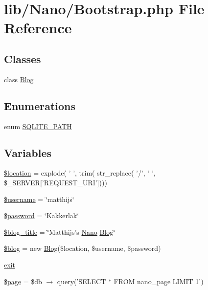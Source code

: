 \hypertarget{Bootstrap_8php}{
\section{lib/Nano/Bootstrap.php File Reference}
\label{Bootstrap_8php}
}
\subsection*{Classes}
\begin{CompactItemize}
\item 
class \hyperlink{classBlog}{Blog}
\end{CompactItemize}
\subsection*{Enumerations}
\begin{CompactItemize}
\item 
enum \hyperlink{Bootstrap_8php_6c0b526c01fb7fbb58a9ff1508514cb2}{SQLITE\_\-PATH} 
\end{CompactItemize}
\subsection*{Variables}
\begin{CompactItemize}
\item 
\hyperlink{Bootstrap_8php_c319193077976bb217112e5a7b7b8022}{\$location} = explode( ' ', trim( str\_\-replace( '/', ' ', \$\_\-SERVER\mbox{[}'REQUEST\_\-URI'\mbox{]})))
\item 
\hyperlink{Bootstrap_8php_0eb82aa5f81cf845de4b36cd653c42cf}{\$username} = \char`\"{}matthijs\char`\"{}
\item 
\hyperlink{Bootstrap_8php_607686ef9f99ea7c42f4f3dd3dbb2b0d}{\$password} = \char`\"{}Kakkerlak\char`\"{}
\item 
\hyperlink{Bootstrap_8php_ede271528177a2e46dd058163b89d0a5}{\$blog\_\-title} = \char`\"{}Matthijs's \hyperlink{classNano}{Nano} \hyperlink{classBlog}{Blog}\char`\"{}
\item 
\hyperlink{Bootstrap_8php_44ed435614c09351c778ca04cd3800de}{\$blog} = new \hyperlink{classBlog}{Blog}(\$location, \$username, \$password)
\item 
\hyperlink{Bootstrap_8php_6733eb5f605d09eaede9845835d71c4e}{exit}
\item 
\hyperlink{Bootstrap_8php_50663ba988a223616576d11c5d905a3a}{\$page} = \$db $\rightarrow$ query('SELECT $\ast$ FROM nano\_\-page LIMIT 1')
\end{CompactItemize}


